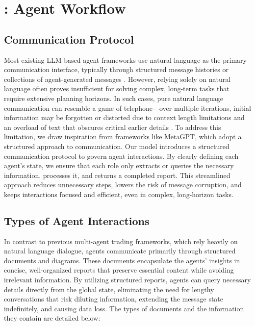 \section{\model: Agent Workflow}

\subsection{Communication Protocol}

Most existing LLM-based agent frameworks use natural language as the primary communication interface, typically through structured message histories or collections of agent-generated messages \citep{fatouros2024largelanguagemodelsbeat, li2023tradinggpt, yang2024finrobotopensourceaiagent, yang2023autogptonlinedecisionmaking}. However, relying solely on natural language often proves insufficient for solving complex, long-term tasks that require extensive planning horizons. In such cases, pure natural language communication can resemble a game of telephone—over multiple iterations, initial information may be forgotten or distorted due to context length limitations and an overload of text that obscures critical earlier details \citep{hong2024metagptmetaprogrammingmultiagent}. To address this limitation, we draw inspiration from frameworks like MetaGPT, which adopt a structured approach to communication. Our model introduces a structured communication protocol to govern agent interactions. By clearly defining each agent's state, we ensure that each role only extracts or queries the necessary information, processes it, and returns a completed report. This streamlined approach reduces unnecessary steps, lowers the risk of message corruption, and keeps interactions focused and efficient, even in complex, long-horizon tasks.

\subsection{Types of Agent Interactions}

In contrast to previous multi-agent trading frameworks, which rely heavily on natural language dialogue, \model agents communicate primarily through structured documents and diagrams. These documents encapsulate the agents' insights in concise, well-organized reports that preserve essential content while avoiding irrelevant information. By utilizing structured reports, agents can query necessary details directly from the global state, eliminating the need for lengthy conversations that risk diluting information, extending the message state indefinitely, and causing data loss. The types of documents and the information they contain are detailed below:

